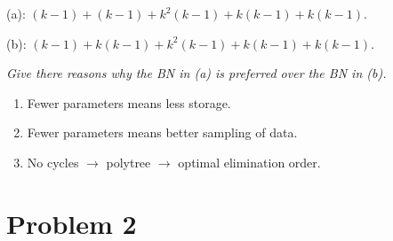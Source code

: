 \documentclass{article}
\begin{document}
\begin{enumerate}[(a)]
  (a): $(k-1)+(k-1)+k^2(k-1)+k(k-1)+k(k-1)$.

  (b): $(k-1)+k(k-1)+k^2(k-1)+k(k-1)+k(k-1)$.

  \textit{Give there reasons why the BN in (a) is preferred over the BN in (b).}

  \begin{enumerate}
  \item Fewer parameters means less storage.
  \item Fewer parameters means better sampling of data.
  \item No cycles $\rightarrow$ polytree $\rightarrow$ optimal
    elimination order.
  \end{enumerate}

\end{enumerate}

\section{Problem 2}
\end{document}
